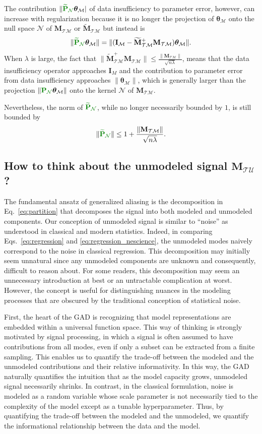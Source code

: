 \documentclass[twocolumn,aps,prx,superscriptaddress,10pt]{revtex4-2}
\newcommand{\0}{\bm{0}}
\newcommand{\btheta}{\boldsymbol{\theta}}
\newcommand{\M}{\mathcal{M}} %
\newcommand{\K}{\mathcal{N}} %
\newcommand{\T}{\mathcal{T}} %
\newcommand{\U}{\mathcal{U}} %
\newcommand{\bbPN}{{\color{Green}{\mathbf{P}_{\K}}}} %
\newcommand{\bbPNt}{{\color{Green}{\widetilde{\mathbf{P}}_{\K}}}} %
\newcommand{\bbI}{\mathbf{I}}
\newcommand{\bbM}{\mathbf{M}}
\newcommand{\MTM}{\bbM_{\T\M}}
\newcommand{\tMTM}{\widetilde{\bbM}_{\T\M}}
\newcommand{\MTU}{\bbM_{\T\U}}
\begin{document}
The contribution $\|\bbPNt \btheta_\M|$ of data insufficiency to parameter error, however, can increase with regularization because it is no longer the projection of $\btheta_\M$ onto the null space $\K$ of $\MTM$ or $\tMTM$ but instead is 
\[
\|\bbPNt \btheta_\M\| = \|(\bbI_\M - \tMTM^+ \MTM) \btheta_\M\|.
\]
When $\lambda$ is large, the fact that  $\|\tMTM^+ \MTM\|\le \frac{\|\MTM\|}{\sqrt{n \lambda}}$, means that the data insufficiency operator approaches $\bbI_M$ and the contribution to parameter error from data insufficiency approaches $\|\btheta_\M\|$, which is generally larger than the projection $\|\bbPN \btheta_\M\|$ onto the kernel $\K$ of $\MTM$. 

Nevertheless, the norm of $\bbPNt$, while no longer necessarily bounded by $1$, is still bounded by 
\[
\|\bbPNt\| \le 1 + \frac{\|\MTM\|}{\sqrt{n\lambda}}.
\]

\subsection{How to think about the unmodeled signal  \texorpdfstring{$\MTU$?}{MTU}}
\label{sec:nescience}

The fundamental ansatz of generalized aliasing is the decomposition in Eq.~\eqref{eq:partition} that decomposes the signal into both modeled and unmodeled components.
Our conception of unmodeled signal is similar to ``noise'' as understood in classical and modern statistics.
Indeed, in comparing Eqs.~\eqref{eq:regression} and \eqref{eq:regression_nescience}, the unmodeled modes naively correspond to the noise in classical regression.
This decomposition may initially seem unnatural since any unmodeled components are unknown and consequently, difficult to reason about.
For some readers, this decomposition may seem an unnecessary introduction at best or an untractable complication at worst.
However, the concept is useful for distinguishing nuances in the modeling processes that are obscured by the traditional conception of statistical noise.

First, the heart of the GAD is recognizing that model representations are embedded within a universal function space.
This way of thinking is strongly motivated by signal processing, in which a signal is often assumed to have contributions from all modes, even if only a subset can be extracted from a finite sampling.
This enables us to quantify the trade-off between the modeled and the unmodeled contributions and their relative informativity.
In this way, the GAD naturally quantifies the intuition that as the model capacity grows, unmodeled signal necessarily shrinks.
In contrast, in the classical formulation, noise is modeled as a random variable whose scale parameter is not necessarily tied to the complexity of the model except as a tunable hyperparameter.
Thus, by quantifying the trade-off between the modeled and the unmodeled, we quantify the informational relationship between the data and the model.
\end{document}
